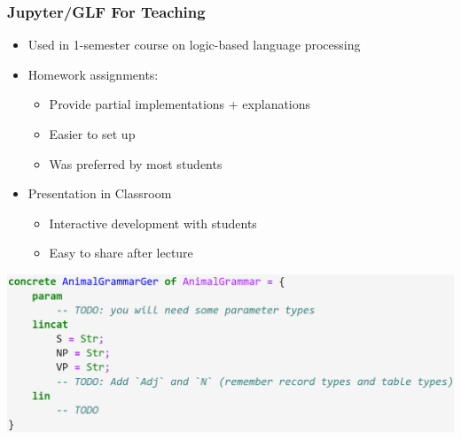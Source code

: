 \documentclass{beamer}
\begin{document}
\begin{frame}
    \frametitle{Jupyter/GLF For Teaching}
    \begin{itemize}
        \item Used in 1-semester course on logic-based language processing
        \item Homework assignments:
            \begin{itemize}
                \item Provide partial implementations + explanations
                \item Easier to set up
                \item Was preferred by most students
            \end{itemize}
        \item Presentation in Classroom
            \begin{itemize}
                \item Interactive development with students
                \item Easy to share after lecture
            \end{itemize}
    \end{itemize}

    \centering
    \vspace{1em}
    \includegraphics[scale=0.22]{problem.png}
\end{frame}
\end{document}
